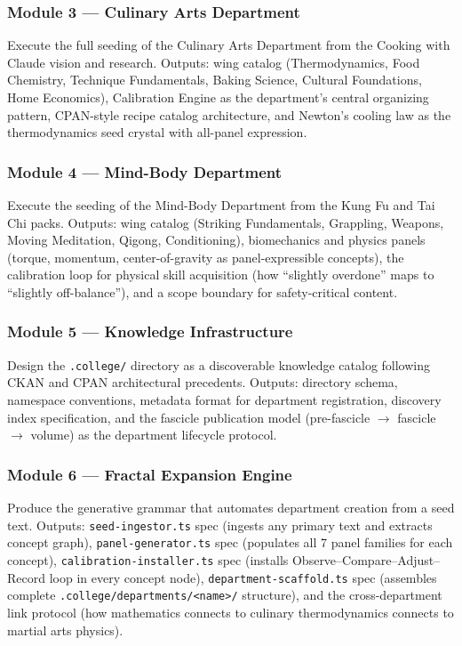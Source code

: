 \documentclass[11pt,letterpaper]{article}
\begin{document}
\subsubsection{Module 3 --- Culinary Arts Department}
Execute the full seeding of the Culinary Arts Department from the Cooking with Claude vision and research. Outputs: wing catalog (Thermodynamics, Food Chemistry, Technique Fundamentals, Baking Science, Cultural Foundations, Home Economics), Calibration Engine as the department's central organizing pattern, CPAN-style recipe catalog architecture, and Newton's cooling law as the thermodynamics seed crystal with all-panel expression.

\subsubsection{Module 4 --- Mind-Body Department}
Execute the seeding of the Mind-Body Department from the Kung Fu and Tai Chi packs. Outputs: wing catalog (Striking Fundamentals, Grappling, Weapons, Moving Meditation, Qigong, Conditioning), biomechanics and physics panels (torque, momentum, center-of-gravity as panel-expressible concepts), the calibration loop for physical skill acquisition (how ``slightly overdone'' maps to ``slightly off-balance''), and a scope boundary for safety-critical content.

\subsubsection{Module 5 --- Knowledge Infrastructure}
Design the \texttt{.college/} directory as a discoverable knowledge catalog following CKAN and CPAN architectural precedents. Outputs: directory schema, namespace conventions, metadata format for department registration, discovery index specification, and the fascicle publication model (pre-fascicle $\rightarrow$ fascicle $\rightarrow$ volume) as the department lifecycle protocol.

\subsubsection{Module 6 --- Fractal Expansion Engine}
Produce the generative grammar that automates department creation from a seed text. Outputs: \texttt{seed-ingestor.ts} spec (ingests any primary text and extracts concept graph), \texttt{panel-generator.ts} spec (populates all 7 panel families for each concept), \texttt{calibration-installer.ts} spec (installs Observe--Compare--Adjust--Record loop in every concept node), \texttt{department-scaffold.ts} spec (assembles complete \texttt{.college/departments/<name>/} structure), and the cross-department link protocol (how mathematics connects to culinary thermodynamics connects to martial arts physics).
\end{document}
